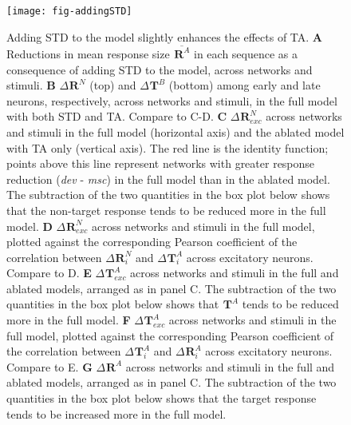 \documentclass[9pt,lineno,onehalfspacing]{elife}
\newcommand{\dev}{\textit{dev}}
\newcommand{\msc}{\textit{msc}}
\newcommand{\R}[3][]{{}^{#1}_{}\boldsymbol R^{#2}_{#3}}
\newcommand{\T}[3][]{{}^{#1}_{}\boldsymbol T^{#2}_{#3}}
\newcommand{\mean}[1]{\overline{#1}}
\begin{document}
\begin{figure}
    \texttt{[image: fig-addingSTD]}
    \caption{%
        Adding STD to the model slightly enhances the effects of TA.
        \textbf{A} Reductions in mean response size $\mean{\R{A}{}}$ in each sequence as a consequence of adding STD to the model, across networks and stimuli.
        \textbf{B} $\Delta \R{N}{}$ (top) and $\Delta \T{B}{}$ (bottom) among early and late neurons, respectively, across networks and stimuli, in the full model with both STD and TA. Compare to C-D.
        \textbf{C} $\Delta \R{N}{exc}$ across networks and stimuli in the full model (horizontal axis) and the ablated model with TA only (vertical axis). The red line is the identity function; points above this line represent networks with greater response reduction (\dev{} - \msc{}) in the full model than in the ablated model. The subtraction of the two quantities in the box plot below shows that the non-target response tends to be reduced more in the full model.
        \textbf{D} $\Delta \R{N}{exc}$ across networks and stimuli in the full model, plotted against the corresponding Pearson coefficient of the correlation between $\Delta \R{N}{i}$ and $\Delta \T{A}{i}$ across excitatory neurons. Compare to D.
        \textbf{E} $\Delta \T{A}{exc}$ across networks and stimuli in the full and ablated models, arranged as in panel C. The subtraction of the two quantities in the box plot below shows that $\T{A}{}$ tends to be reduced more in the full model.
        \textbf{F} $\Delta \T{A}{exc}$ across networks and stimuli in the full model, plotted against the corresponding Pearson coefficient of the correlation between $\Delta \T{A}{i}$ and $\Delta \R{A}{i}$ across excitatory neurons. Compare to E.
        \textbf{G} $\Delta \R{A}{}$ across networks and stimuli in the full and ablated models, arranged as in panel C. The subtraction of the two quantities in the box plot below shows that the target response tends to be increased more in the full model.
    }
    \label{fig:addingSTD}
\end{figure}
\end{document}
